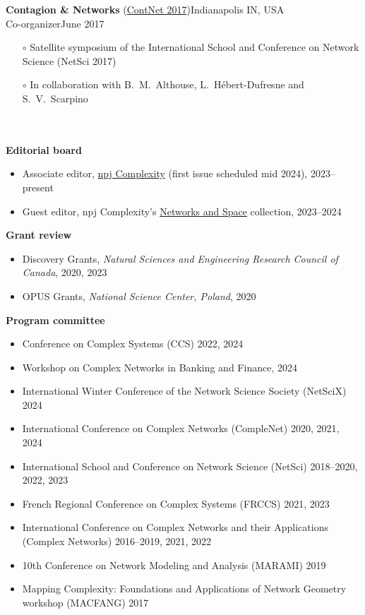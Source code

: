 \documentclass[11pt]{article}
\newcommand{\TitreSection}[1]{\colorbox{background}{\makebox[\textwidth-0.5em][c]{\Large\textrm{\textsc{#1}}}}\vspace{0.75\baselineskip}\\}
\begin{document}
%
\parbox{\textwidth}{%
\textbf{Contagion \& Networks} (\href{http://networkscontagion.github.io/contnet2017/}{ContNet 2017})\hfill Indianapolis IN, USA\\
Co-organizer\hfill June 2017
\begin{itemize}[leftmargin=1.5em]\small
  \item[$\circ$] Satellite symposium of the International School and Conference on Network Science (NetSci 2017)
  \item[$\circ$] In collaboration with B.~M.~Althouse, L.~H\'ebert-Dufresne and S.~V.~Scarpino
\end{itemize}} \vspace{0.75\baselineskip} \\
%
%
%
%
%
\TitreSection{Reviewing Activities}
%
\textbf{Editorial board}
%
\begin{itemize}\small
  \item Associate editor, \href{https://www.nature.com/npjcomplex}{npj Complexity} (first issue scheduled mid 2024), 2023--present
  \item Guest editor, npj Complexity's \href{https://www.nature.com/collections/jbahhgfhii}{Networks and Space} collection, 2023--2024
\end{itemize}
%
%
%
\textbf{Grant review}
%
\begin{itemize}\small
  \item Discovery Grants, \textit{Natural Sciences and Engineering Research Council of Canada}, 2020, 2023
  \item OPUS Grants, \textit{National Science Center, Poland}, 2020
\end{itemize}
%
%
%
\textbf{Program committee}
%
\begin{itemize}\small
  \item Conference on Complex Systems (CCS) 2022, 2024
  \item Workshop on Complex Networks in Banking and Finance, 2024
  \item International Winter Conference of the Network Science Society (NetSciX) 2024
  \item International Conference on Complex Networks (CompleNet) 2020, 2021, 2024
  \item International School and Conference on Network Science (NetSci) 2018--2020, 2022, 2023
  \item French Regional Conference on Complex Systems (FRCCS) 2021, 2023
  \item International Conference on Complex Networks and their Applications (Complex Networks) 2016--2019, 2021, 2022
  \item 10th Conference on Network Modeling and Analysis (MARAMI) 2019
  \item Mapping Complexity: Foundations and Applications of Network Geometry workshop (MACFANG) 2017
\end{itemize}
\end{document}
